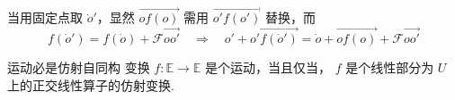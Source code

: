 当用固定点取 $\dot o'$，显然 $\overrightarrow{of(o)}$ 需用 $\overrightarrow{o'f(o')}$ 替换，而
\begin{equation}
f(\dot o')=f(\dot o)+\mathcal F \overrightarrow{oo'}\quad\Rightarrow \quad o'+\overrightarrow{o'f(\dot o')}=\dot o+\overrightarrow{of(o)}+\mathcal F \overrightarrow{oo'}
\end{equation}




\begin{theorem}{运动必是仿射自同构}
变换 $f:\mathbb E\rightarrow\mathbb E$ 是个运动，当且仅当， $f$ 是个线性部分为 $U$ 上的正交线性算子的仿射变换.
\end{theorem}